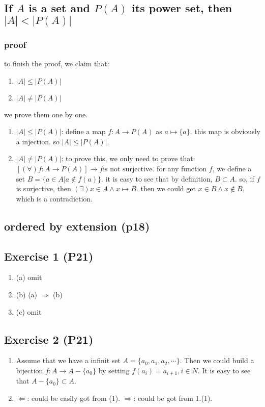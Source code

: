 \documentclass[11pt]{article}
\begin{document}
\subsection{If \(A\) is a set and \(P(A)\) its power set, then \(|A| < |P(A)|\)}
\label{sec:org3391ee6}
\subsubsection{proof}
\label{sec:org799dce4}
to finish the proof, we claim that:
\begin{enumerate}
\item \(|A| \leq |P(A)|\)
\item \(|A| \not= |P(A)|\)
\end{enumerate}
we prove them one by one.
\begin{enumerate}
\item \(|A| \leq |P(A)|\):
define a map \(f: A\to P(A)\) as \(a\mapsto \{a\}\).
this map is obviously a injection. so \(|A| \leq |P(A)|\).
\item \(|A| \not= |P(A)|\):
to prove this, we only need to prove that:
\([(\forall) f: A\to P(A)] \to f \mbox{is not surjective}\).
for any function \(f\), we define a set \(B = \{a\in A | a\not\in f(a)\}\).
it is easy to see that by definition, \(B\subset A\).
so, if \(f\) is surjective, then \((\exists) x\in A \land x\mapsto B\).
then we could get \(x\in B \land x\not\in B\), which is a contradiction.
\end{enumerate}
\subsection{ordered by extension (p18)}
\label{sec:orgf7ee672}
\subsection{Exercise 1 (P21)}
\label{sec:org41bd786}
\begin{enumerate}
\item (a) omit
\item (b) (a) \(\Rightarrow\) (b)
\item (c) omit
\end{enumerate}
\subsection{Exercise 2 (P21)}
\label{sec:org3ed6dfc}
\begin{enumerate}
\item Assume that we have a infinit set \(A = \{a_0, a_1, a_2, \cdots \}\).
Then we could build a bijection \(f: A\to A-\{a_0\}\) by setting \(f(a_i) = a_{i+1}, i\in N\).
It is easy to see that \(A-\{a_0\}\subset A\).
\item \(\Leftarrow\): could be easily got from (1).
\(\Rightarrow\): could be got from 1.(1).
\end{enumerate}
\end{document}
